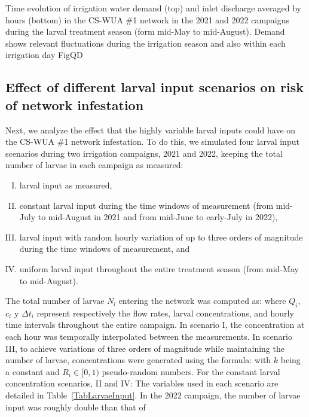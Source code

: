 \documentclass[review,authoryear]{elsarticle}
\begin{document}
{Time evolution of irrigation water demand (top) and inlet discharge averaged by
hours (bottom) in the CS-WUA \#1 network in the 2021 and 2022 campaigns during
the larval treatment season (form mid-May to mid-August). Demand shows relevant
fluctuations during the irrigation season and also within each irrigation day}
{FigQD}

\subsection{Effect of different larval input scenarios on risk of network
	infestation}

Next, we analyze the effect that the highly variable larval inputs could have on
the CS-WUA \#1 network infestation. To do this, we simulated four larval input
scenarios during two irrigation campaigns, 2021 and 2022, keeping the total
number of larvae in each campaign as measured:
\begin{enumerate}[I.]
\item larval input as measured,
\item constant larval input during the time windows of measurement (from
	mid-July to mid-August in 2021 and from mid-June to early-July in 2022),
\item larval input with random hourly variation of up to three orders of
	magnitude during the time windows of measurement, and
\item uniform larval input throughout the entire treatment season (from mid-May
	to mid-August).
\end{enumerate}
The total number of larvae $N_l$ entering the network was computed as:
where $Q_i$, $c_i$ y $\Delta t_i$ represent respectively the flow rates, larval
concentrations, and hourly time intervals throughout the entire campaign. In
scenario I, the concentration at each hour was temporally interpolated between
the measurements. In scenario III, to achieve variations of three orders of
magnitude while maintaining the number of larvae, concentrations were generated
using the formula:
with $k$ being a constant and $R_i\in[0,1)$ pseudo-random numbers. For
the constant larval concentration scenarios, II and IV:
The variables used in each scenario are detailed in Table~\ref{TabLarvaeInput}.
In the 2022 campaign, the number of larvae input was roughly double than that of
\end{document}
